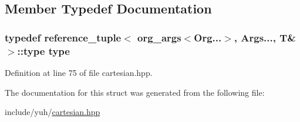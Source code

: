 \subsection{\-Member \-Typedef \-Documentation}
\hypertarget{structyuh_1_1detail_1_1reference__tuple_3_01org__args_3_01T_00_01Org_8_8_8_4_00_01Args_8_8_8_4_aa39f06150f5b32cac0af75bb2f752b94}{
\subsubsection[{type}]{\setlength{\rightskip}{0pt plus 5cm}typedef {\bf reference\-\_\-tuple}$<$ {\bf org\-\_\-args}$<$\-Org...$>$, \-Args..., \-T\& $>$\-::{\bf type} {\bf type}}}\label{d9/d25/structyuh_1_1detail_1_1reference__tuple_3_01org__args_3_01T_00_01Org_8_8_8_4_00_01Args_8_8_8_4_aa39f06150f5b32cac0af75bb2f752b94}


\-Definition at line 75 of file cartesian.\-hpp.



\-The documentation for this struct was generated from the following file\-:\begin{DoxyCompactItemize}
\item 
include/yuh/\hyperlink{cartesian_8hpp}{cartesian.\-hpp}\end{DoxyCompactItemize}
